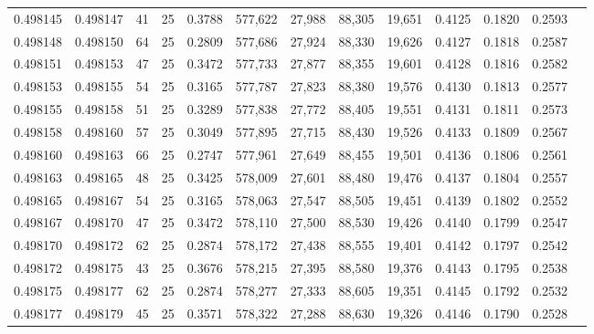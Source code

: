 \begin{tabular}{rrrrrrrrrrrrr}
0.498145 & 0.498147 &    41 &  25 &                                     0.3788 & 577,622 &  27,988 &  88,305 &  19,651 & 0.4125 & 0.1820 & 0.2593 \\
0.498148 & 0.498150 &    64 &  25 &                                     0.2809 & 577,686 &  27,924 &  88,330 &  19,626 & 0.4127 & 0.1818 & 0.2587 \\
0.498151 & 0.498153 &    47 &  25 &                                     0.3472 & 577,733 &  27,877 &  88,355 &  19,601 & 0.4128 & 0.1816 & 0.2582 \\
0.498153 & 0.498155 &    54 &  25 &                                     0.3165 & 577,787 &  27,823 &  88,380 &  19,576 & 0.4130 & 0.1813 & 0.2577 \\
0.498155 & 0.498158 &    51 &  25 &                                     0.3289 & 577,838 &  27,772 &  88,405 &  19,551 & 0.4131 & 0.1811 & 0.2573 \\
0.498158 & 0.498160 &    57 &  25 &                                     0.3049 & 577,895 &  27,715 &  88,430 &  19,526 & 0.4133 & 0.1809 & 0.2567 \\
0.498160 & 0.498163 &    66 &  25 &                                     0.2747 & 577,961 &  27,649 &  88,455 &  19,501 & 0.4136 & 0.1806 & 0.2561 \\
0.498163 & 0.498165 &    48 &  25 &                                     0.3425 & 578,009 &  27,601 &  88,480 &  19,476 & 0.4137 & 0.1804 & 0.2557 \\
0.498165 & 0.498167 &    54 &  25 &                                     0.3165 & 578,063 &  27,547 &  88,505 &  19,451 & 0.4139 & 0.1802 & 0.2552 \\
0.498167 & 0.498170 &    47 &  25 &                                     0.3472 & 578,110 &  27,500 &  88,530 &  19,426 & 0.4140 & 0.1799 & 0.2547 \\
0.498170 & 0.498172 &    62 &  25 &                                     0.2874 & 578,172 &  27,438 &  88,555 &  19,401 & 0.4142 & 0.1797 & 0.2542 \\
0.498172 & 0.498175 &    43 &  25 &                                     0.3676 & 578,215 &  27,395 &  88,580 &  19,376 & 0.4143 & 0.1795 & 0.2538 \\
0.498175 & 0.498177 &    62 &  25 &                                     0.2874 & 578,277 &  27,333 &  88,605 &  19,351 & 0.4145 & 0.1792 & 0.2532 \\
0.498177 & 0.498179 &    45 &  25 &                                     0.3571 & 578,322 &  27,288 &  88,630 &  19,326 & 0.4146 & 0.1790 & 0.2528 \\

\end{tabular}
